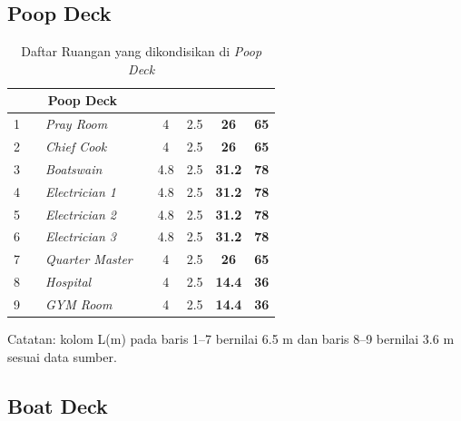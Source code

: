 \documentclass[12pt,a4paper,twoside,openright]{book}
\theoremstyle{definition}
\theoremstyle{plain}
\theoremstyle{remark}
\begin{document}
\subsection*{Poop Deck}

\begin{table}[H]
\centering
\caption{Daftar Ruangan yang dikondisikan di \textit{Poop Deck}}
\footnotesize
\begin{tabularx}{\textwidth}{|c|c|X|c|c|c|c|c|}
\hline
\rowcolor{tableheader}
 & \multicolumn{2}{c|}{\textbf{Poop Deck}} & & & & & \\
\hline
1 & & \textit{Pray Room} & & 4 & 2.5 & \textbf{26} & \textbf{65} \\
\hline
2 & & \textit{Chief Cook} & & 4 & 2.5 & \textbf{26} & \textbf{65} \\
\hline
3 & & \textit{Boatswain} & & 4.8 & 2.5 & \textbf{31.2} & \textbf{78} \\
\hline
4 & & \textit{Electrician 1} & & 4.8 & 2.5 & \textbf{31.2} & \textbf{78} \\
\hline
5 & & \textit{Electrician 2} & & 4.8 & 2.5 & \textbf{31.2} & \textbf{78} \\
\hline
6 & & \textit{Electrician 3} & & 4.8 & 2.5 & \textbf{31.2} & \textbf{78} \\
\hline
7 & & \textit{Quarter Master} & & 4 & 2.5 & \textbf{26} & \textbf{65} \\
\hline
8 & & \textit{Hospital} & & 4 & 2.5 & \textbf{14.4} & \textbf{36} \\
\hline
9 & & \textit{GYM Room} & & 4 & 2.5 & \textbf{14.4} & \textbf{36} \\
\hline
\end{tabularx}

\vspace{2pt}
{\footnotesize Catatan: kolom L(m) pada baris 1--7 bernilai 6.5 m dan baris 8--9 bernilai 3.6 m sesuai data sumber.}
\end{table}

\subsection*{Boat Deck}
\end{document}
